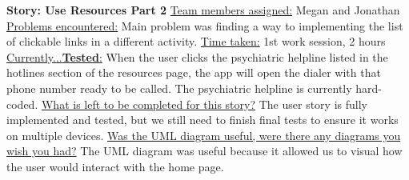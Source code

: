 \documentclass[letterpaper,12pt,titlepage]{article}
\begin{document}
\noindent
\textbf{Story: Use Resources Part 2}
\newline
\newline
\underline{Team members assigned:}
Megan and Jonathan
\newline
\underline{Problems encountered:}
Main problem was finding a way to implementing the list of clickable links in a different activity.
\newline
\underline{Time taken:}
1st work session, 2 hours
\newline
\underline{Currently...\textbf{Tested}:}
When the user clicks the psychiatric helpline listed in the hotlines section of the resources page, the app will open the dialer with that phone number ready to be called. The psychiatric helpline is currently hard-coded.
\newline
\underline{What is left to be completed for this story?}
The user story is fully implemented and tested, but we still need to finish final tests to ensure it works on multiple devices.
\newline
\underline{Was the UML diagram useful, were there any diagrams you wish you had?}
The UML diagram was useful because it allowed us to visual how the user would interact with the home page.
\newline
\newline
\end{document}
